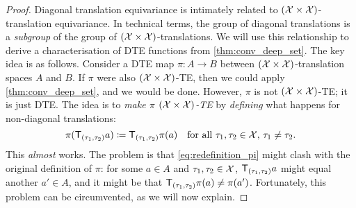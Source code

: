 \documentclass[12pt, twoside]{report}
\begin{document}
\begin{proof}
Diagonal translation equivariance is intimately related to $(\mathcal{X} \times \mathcal{X})$-translation equivariance.
In technical terms, the group of diagonal translations is a \emph{subgroup} of the group of $(\mathcal{X} \times \mathcal{X})$-translations.
We will use this relationship to derive a characterisation of DTE functions from \cref{thm:conv_deep_set}.
The key idea is as follows.
Consider a DTE map $\pi \colon A \to B$ between $(\mathcal{X} \times \mathcal{X})$-translation spaces $A$ and $B$.
If $\pi$ were also $(\mathcal{X} \times \mathcal{X})$-TE, then we could apply \cref{thm:conv_deep_set}, and we would be done.
However, $\pi$ is not $(\mathcal{X} \times \mathcal{X})$-TE; it is just DTE.
The idea is to \emph{make $\pi$ $(\mathcal{X} \times \mathcal{X})$-TE} by \emph{defining} what happens for non-diagonal translations:
\begin{equation} \label{eq:redefinition_pi}
    \pi(\T_{(\tau_1, \tau_2)} a) \coloneqq \T_{(\tau_1, \tau_2)} \pi(a)
    \quad
    \text{for all $\tau_1, \tau_2 \in \X$, $\tau_1 \neq \tau_2$}.
\end{equation}
This \emph{almost} works.
The problem is that \eqref{eq:redefinition_pi} might clash with the original definition of $\pi$:
for some $a \in A$ and $\tau_1, \tau_2 \in \mathcal{X}$, $\T_{(\tau_1, \tau_2)} a$ might equal another $a' \in A$, and it might be that $\T_{(\tau_1, \tau_2)} \pi(a) \neq \pi(a')$.
Fortunately, this problem can be circumvented, as we will now explain.


\end{proof}
\end{document}
